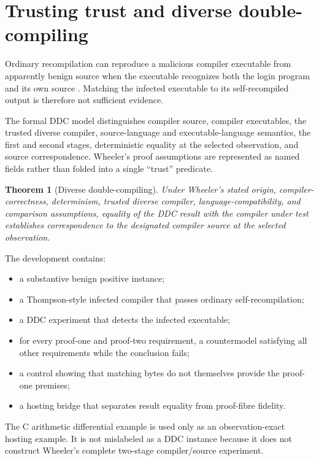 \documentclass[11pt]{article}
\newtheorem{theorem}[definition]{Theorem}
\begin{document}
\section{Trusting trust and diverse double-compiling}

Ordinary recompilation can reproduce a malicious compiler executable from
apparently benign source when the executable recognizes both the login program
and its own source \cite{thompson1984}.  Matching the infected executable to
its self-recompiled output is therefore not sufficient evidence.

The formal DDC model distinguishes compiler source, compiler executables, the
trusted diverse compiler, source-language and executable-language semantics,
the first and second stages, deterministic equality at the selected
observation, and source correspondence.  Wheeler's proof assumptions are
represented as named fields rather than folded into a single ``trust''
predicate.

\begin{theorem}[Diverse double-compiling]
Under Wheeler's stated origin, compiler-correctness, determinism, trusted
diverse compiler, language-compatibility, and comparison assumptions, equality
of the DDC result with the compiler under test establishes correspondence to
the designated compiler source at the selected observation.
\end{theorem}

The development contains:

\begin{itemize}
  \item a substantive benign positive instance;
  \item a Thompson-style infected compiler that passes ordinary
        self-recompilation;
  \item a DDC experiment that detects the infected executable;
  \item for every proof-one and proof-two requirement, a countermodel satisfying
        all other requirements while the conclusion fails;
  \item a control showing that matching bytes do not themselves provide the
        proof-one premises;
  \item a hosting bridge that separates result equality from proof-fibre
        fidelity.
\end{itemize}

The C arithmetic differential example is used only as an observation-exact
hosting example.  It is not mislabeled as a DDC instance because it does not
construct Wheeler's complete two-stage compiler/source experiment.
\end{document}
